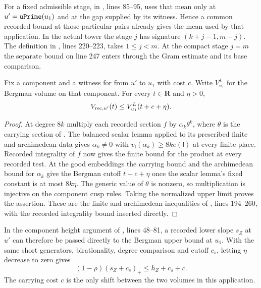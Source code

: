 For a fixed admissible stage,
 in , lines 85--95,
uses that mean only at \(u'=\texttt{uPrime}(u_1)\) and at the gap
supplied by its  witness. Hence a common recorded
bound at those particular pairs already gives the mean used by that
application. In the actual tower the stage \(j\) has signature
\((k+j-1,m-j)\). The definition  in
, lines 220--223, takes \(1\le j<m\).
At the compact stage \(j=m\) the separate  bound on
line 247 enters through the Gram estimate and its base comparison.

\begin{corollary}\label{mixrec:carry}
Fix a component and a witness for  from \(u'\) to \(u_1\)
with cost \(c\). Write \(V^L_{u_1}\) for the Bergman volume on that
component. For every \(t\in\mathbf R\) and \(\eta>0\),
\[
       V_{{\rm rec},u'}(t)\le V^L_{u_1}(t+c+\eta).
\]
\end{corollary}
\begin{proof}
At degree \(8k\) multiply each recorded section \(f\) by
\(\alpha_k\theta^k\), where \(\theta\) is the carrying section of
. The balanced scalar lemma applied to its prescribed
finite and archimedean data gives \(\alpha_k\ne0\) with
\(v_{\mathfrak l}(\alpha_k)\ge 8k e(\mathfrak l)\) at every
finite place. Recorded integrality of \(f\) now gives the finite
bound for the product at every recorded test. At the good embeddings
the carrying bound and the archimedean bound for \(\alpha_k\) give
the Bergman cutoff \(t+c+\eta\) once the scalar lemma's fixed
constant is at most \(8k\eta\). The generic value of \(\theta\)
is nonzero, so multiplication is injective on the component cusp
rules. Taking the normalized upper limit proves the assertion.
These are the finite and archimedean inequalities of
, lines 194--260, with the
recorded integrality bound inserted directly.
\end{proof}

In the component height argument of ,
lines 48--81, a recorded lower slope \(s_Z\) at \(u'\) can therefore
be passed directly to the Bergman upper bound at \(u_1\). With the
same short generators, birationality, degree comparison and
cutoff \(c_s\), letting \(\eta\) decrease to zero gives
\[
         (1-\rho)(s_Z+c_s)_+\le h_Z+c_s+c .
\]
The carrying cost \(c\) is the only shift between the two volumes
in this application.

